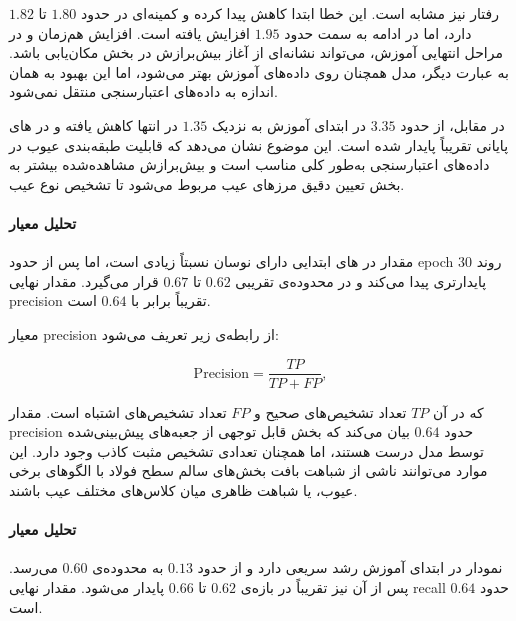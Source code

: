 \documentclass[a4paper, 10pt, twocolumn]{article}
\begin{document}
	رفتار  نیز مشابه است. این خطا ابتدا کاهش پیدا کرده و کمینه‌ای در حدود $1.80$ تا $1.82$ دارد، اما در ادامه به سمت حدود $1.95$ افزایش یافته است. افزایش هم‌زمان  و  در مراحل انتهایی آموزش، می‌تواند نشانه‌ای از آغاز بیش‌برازش در بخش مکان‌یابی باشد. به عبارت دیگر، مدل همچنان روی داده‌های آموزش بهتر می‌شود، اما این بهبود به همان اندازه به داده‌های اعتبارسنجی منتقل نمی‌شود.
	
	در مقابل،  از حدود $3.35$ در ابتدای آموزش به نزدیک $1.35$ در انتها کاهش یافته و در های پایانی تقریباً پایدار شده است. این موضوع نشان می‌دهد که قابلیت طبقه‌بندی عیوب در داده‌های اعتبارسنجی به‌طور کلی مناسب است و بیش‌برازش مشاهده‌شده بیشتر به بخش تعیین دقیق مرزهای عیب مربوط می‌شود تا تشخیص نوع عیب.
	
	\paragraph{تحلیل معیار }
	
	مقدار  در های ابتدایی دارای نوسان نسبتاً زیادی است، اما پس از حدود epoch $30$ روند پایدارتری پیدا می‌کند و در محدوده‌ی تقریبی $0.62$ تا $0.67$ قرار می‌گیرد. مقدار نهایی precision تقریباً برابر با $0.64$ است.
	
	معیار precision از رابطه‌ی زیر تعریف می‌شود:
	
	\begin{latin}
		\begin{equation}
			\text{Precision} =
			\frac{TP}{TP + FP},
		\end{equation}
	\end{latin}
	
	که در آن $TP$ تعداد تشخیص‌های صحیح و $FP$ تعداد تشخیص‌های اشتباه است. مقدار precision حدود $0.64$ بیان می‌کند که بخش قابل توجهی از جعبه‌های پیش‌بینی‌شده توسط مدل درست هستند، اما همچنان تعدادی تشخیص مثبت کاذب وجود دارد. این موارد می‌توانند ناشی از شباهت بافت بخش‌های سالم سطح فولاد با الگوهای برخی عیوب، یا شباهت ظاهری میان کلاس‌های مختلف عیب باشند.
	
	\paragraph{تحلیل معیار }
	
	نمودار  در ابتدای آموزش رشد سریعی دارد و از حدود $0.13$ به محدوده‌ی $0.60$ می‌رسد. پس از آن نیز تقریباً در بازه‌ی $0.62$ تا $0.66$ پایدار می‌شود. مقدار نهایی recall حدود $0.64$ است.
	
\end{document}
